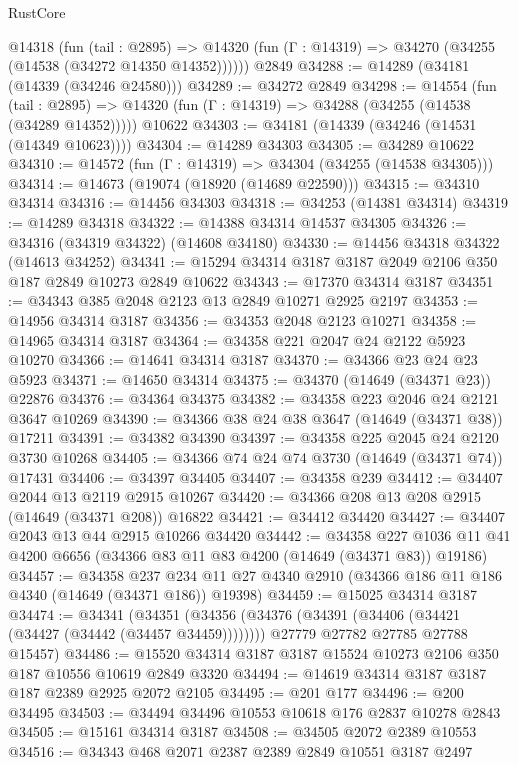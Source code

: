 \begin{lexlean}{RustCore}
\begin{coremodule}
    @14318
      (fun (tail : @2895) =>
      @14320 (fun (Γ : @14319) => @34270 (@34255 (@14538 (@34272 @14350 @14352))))))
    @2849
@34288 := @14289 (@34181 (@14339 (@34246 @24580)))
@34289 := @34272 @2849
@34298 := @14554
    (fun (tail : @2895) => @14320 (fun (Γ : @14319) => @34288 (@34255 (@14538 (@34289 @14352)))))
    @10622
@34303 := @34181 (@14339 (@34246 (@14531 (@14349 @10623))))
@34304 := @14289 @34303
@34305 := @34289 @10622
@34310 := @14572 (fun (Γ : @14319) => @34304 (@34255 (@14538 @34305)))
@34314 := @14673 (@19074 (@18920 (@14689 @22590)))
@34315 := @34310 @34314
@34316 := @14456 @34303
@34318 := @34253 (@14381 @34314)
@34319 := @14289 @34318
@34322 := @14388 @34314 @14537 @34305
@34326 := @34316 (@34319 @34322) (@14608 @34180)
@34330 := @14456 @34318 @34322 (@14613 @34252)
@34341 := @15294 @34314 @3187 @3187 @2049 @2106 @350 @187 @2849 @10273 @2849 @10622
@34343 := @17370 @34314 @3187
@34351 := @34343 @385 @2048 @2123 @13 @2849 @10271 @2925 @2197
@34353 := @14956 @34314 @3187
@34356 := @34353 @2048 @2123 @10271
@34358 := @14965 @34314 @3187
@34364 := @34358 @221 @2047 @24 @2122 @5923 @10270
@34366 := @14641 @34314 @3187
@34370 := @34366 @23 @24 @23 @5923
@34371 := @14650 @34314
@34375 := @34370 (@14649 (@34371 @23)) @22876
@34376 := @34364 @34375
@34382 := @34358 @223 @2046 @24 @2121 @3647 @10269
@34390 := @34366 @38 @24 @38 @3647 (@14649 (@34371 @38)) @17211
@34391 := @34382 @34390
@34397 := @34358 @225 @2045 @24 @2120 @3730 @10268
@34405 := @34366 @74 @24 @74 @3730 (@14649 (@34371 @74)) @17431
@34406 := @34397 @34405
@34407 := @34358 @239
@34412 := @34407 @2044 @13 @2119 @2915 @10267
@34420 := @34366 @208 @13 @208 @2915 (@14649 (@34371 @208)) @16822
@34421 := @34412 @34420
@34427 := @34407 @2043 @13 @44 @2915 @10266 @34420
@34442 := @34358
    @227
    @1036
    @11
    @41
    @4200
    @6656
    (@34366 @83 @11 @83 @4200 (@14649 (@34371 @83)) @19186)
@34457 := @34358
    @237
    @234
    @11
    @27
    @4340
    @2910
    (@34366 @186 @11 @186 @4340 (@14649 (@34371 @186)) @19398)
@34459 := @15025 @34314 @3187
@34474 := @34341
    (@34351
      (@34356 (@34376 (@34391 (@34406 (@34421 (@34427 (@34442 (@34457 @34459))))))))
      @27779
      @27782
      @27785
      @27788
      @15457)
@34486 := @15520 @34314 @3187 @3187 @15524 @10273 @2106 @350 @187 @10556 @10619 @2849 @3320
@34494 := @14619 @34314 @3187 @3187 @187 @2389 @2925 @2072 @2105
@34495 := @201 @177
@34496 := @200 @34495
@34503 := @34494 @34496 @10553 @10618 @176 @2837 @10278 @2843
@34505 := @15161 @34314 @3187
@34508 := @34505 @2072 @2389 @10553
@34516 := @34343 @468 @2071 @2387 @2389 @2849 @10551 @3187 @2497

\end{coremodule}
\end{lexlean}
